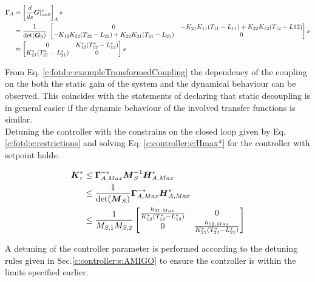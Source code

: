 \begin{align}
\begin{split}
\mbox{\boldmath$\Gamma$}_A &= \left[\frac{d}{ds}\mbox{\boldmath$G$}|^*_{s=0}\right]_A s \\
&= \frac{1}{\det(\mbox{\boldmath$G$}_0)}~\begin{bmatrix}
0 & -K_{21}K_{11}(T_{11}-L_{11}) + K_{22}K_{12}(T_{12}-L{12}) \\
-K_{12}K_{22}(T_{22}-L_{22}) + K_{22}K_{21}(T_{21}-L_{21}) & 0
\end{bmatrix} s\\
&\approx \begin{bmatrix}
0 & K_{12}^* (T_{12}^* - L_{12}^*) \\
K_{21}^* (T_{21}^* - L_{21}^*) & 0 
\end{bmatrix} s
\end{split}
\label{c:fotd:e:exampleTransformedCoupling}
\end{align}

From Eq. \ref{c:fotd:e:exampleTransformedCoupling} the dependency of the coupling on the both the static gain of the system and the dynamical behaviour can be observed. This coincides with the statements of \cite{Lunze2014} declaring that static decoupling is in general easier if the dynamic behaviour of the involved transfer functions is similar.\\

Detuning the controller with the constrains on the closed loop given by Eq. \ref{c:fotd:e:restrictions} and solving Eq. \ref{c:controller:e:Hmax*} for the controller with setpoint holds:

\begin{align}
\begin{split}
\mbox{\boldmath$K$}^*_r &\leq \mbox{\boldmath$\Gamma$}^{-*}_{A,Max}\mbox{\boldmath$M$}_S^{-1}\mbox{\boldmath$H$}^*_{A,Max} \\ 
&\leq \frac{1}{\det(\mbox{\boldmath$M$}_S)}\mbox{\boldmath$\Gamma$}^{-*}_{A,Max}\mbox{\boldmath$H$}^*_{A,Max}\\
&\leq \frac{1}{M_{S,1}M_{S,2}}
\begin{bmatrix}
\frac{h_{21,Max}}{K_{12}^* (T_{12}^* - L_{12}^*)} & 0\\
0 & \frac{h_{12,Max}}{K_{21}^* (T_{21}^* - L_{21}^*)} 
\end{bmatrix}
\end{split}
\end{align}

A detuning of the controller parameter is performed according to the detuning rules given in Sec.\ref{c:controller:s:AMIGO} to ensure the controller is within the limits specified earlier.

